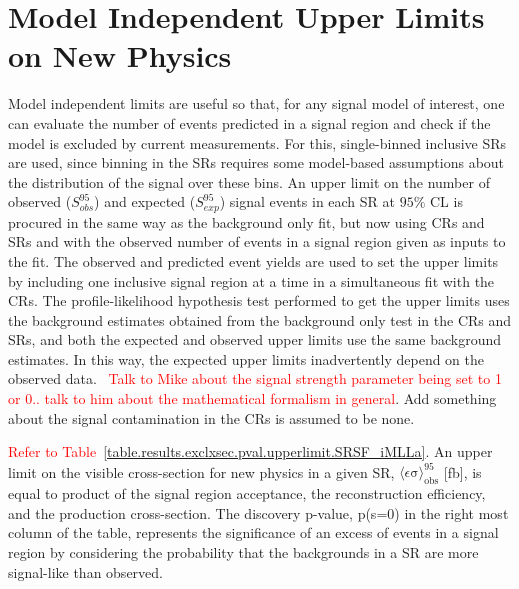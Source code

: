 \section{Model Independent Upper Limits on New Physics}
Model independent limits are useful so that, for any signal model of interest, one can evaluate the number of events predicted in a signal region and check if the model is excluded by current measurements.  For this, single-binned inclusive SRs are used, since binning in the SRs requires some model-based assumptions about the distribution of the signal over these bins.   An upper limit on the number of observed ($S^{95}_{obs}$) and expected ($S^{95}_{exp}$) signal events in each SR at $95\%$ CL is procured in the same way as the background only fit, but now using CRs and SRs and with the observed number of events in a signal region given as inputs to the fit.  The observed and predicted event yields are used to set the upper limits by including one inclusive signal region at a time in a simultaneous fit with the CRs.  The profile-likelihood hypothesis test performed to get the upper limits uses the background estimates obtained from the background only test in the CRs and SRs, and both the expected and observed upper limits use the same background estimates.  In this way, the expected upper limits inadvertently depend on the observed data.  \
\textcolor{red}{Talk to Mike about the signal strength parameter being set to 1 or 0.. talk to him about the mathematical formalism in general}.  Add something about the signal contamination in the CRs is assumed to be none.

\textcolor{red}{Refer to Table~\ref{table.results.exclxsec.pval.upperlimit.SRSF_iMLLa}}.  An upper limit on the visible cross-section for new physics in a given SR, $\langle\epsilon\mathrm{\sigma}\rangle_\text{obs}^{95}$ [fb], is equal to product of the signal region acceptance, the reconstruction efficiency, and the production cross-section.  The discovery p-value, p(s=0) in the right most column of the table, represents the significance of an excess of events in a signal region by considering the probability that the backgrounds in a SR are more signal-like than observed. 

